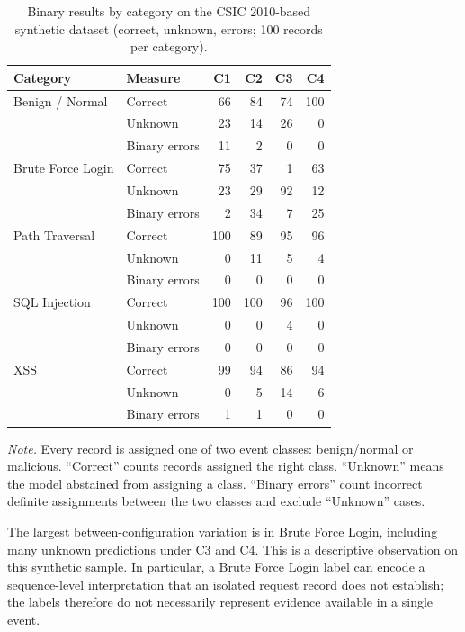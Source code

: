 \begin{table}[H]
\centering
\small
\caption{Binary results by category on the CSIC 2010-based synthetic dataset (correct, unknown, errors; 100 records per category).}
\label{tab:category-binary}
\begin{tabular}{@{}llrrrr@{}}
\toprule
Category & Measure & C1 & C2 & C3 & C4 \\
\midrule
Benign / Normal & Correct & 66 & 84 & 74 & 100 \\
 & Unknown & 23 & 14 & 26 & 0 \\
 & Binary errors & 11 & 2 & 0 & 0 \\
\midrule
Brute Force Login & Correct & 75 & 37 & 1 & 63 \\
 & Unknown & 23 & 29 & 92 & 12 \\
 & Binary errors & 2 & 34 & 7 & 25 \\
\midrule
Path Traversal & Correct & 100 & 89 & 95 & 96 \\
 & Unknown & 0 & 11 & 5 & 4 \\
 & Binary errors & 0 & 0 & 0 & 0 \\
\midrule
SQL Injection & Correct & 100 & 100 & 96 & 100 \\
 & Unknown & 0 & 0 & 4 & 0 \\
 & Binary errors & 0 & 0 & 0 & 0 \\
\midrule
XSS & Correct & 99 & 94 & 86 & 94 \\
 & Unknown & 0 & 5 & 14 & 6 \\
 & Binary errors & 1 & 1 & 0 & 0 \\
\bottomrule
\end{tabular}
\par\smallskip
\begin{minipage}{\textwidth}\footnotesize
\textit{Note.} Every record is assigned one of two event classes:
benign/normal or malicious. ``Correct'' counts records assigned the
right class. ``Unknown'' means the model abstained from assigning a
class. ``Binary errors'' count incorrect definite assignments between
the two classes and exclude ``Unknown'' cases.
\end{minipage}
\end{table}

The largest between-configuration variation is in Brute Force Login,
including many unknown predictions under C3 and C4. This is a
descriptive observation on this synthetic sample. In particular, a
Brute Force Login label can encode a sequence-level interpretation that
an isolated request record does not establish; the labels therefore do
not necessarily represent evidence available in a single event.

